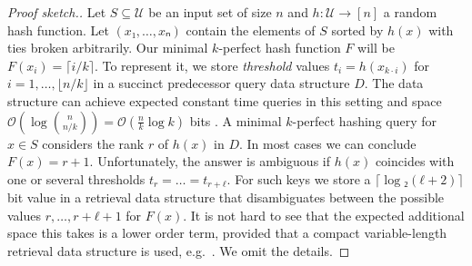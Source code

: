 \documentclass[cleveref,thm-restate]{lipics-v2021}
\begin{document}
\begin{proof}[Proof sketch.]
    Let $S ⊆ 𝒰$ be an input set of size $n$ and $h : 𝒰 → [n]$ a random hash function. Let $(x₁,…,xₙ)$ contain the elements of $S$ sorted by $h(x)$ with ties broken arbitrarily. Our minimal $k$-perfect hash function $F$ will be $F(x_i) = ⌈i/k⌉$. To represent it, we store \emph{threshold} values $t_i = h(x_{k·i})$ for $i = 1,…,⌊n/k⌋$ in a succinct predecessor query data structure $D$. The data structure can achieve expected constant time queries in this setting and space $𝒪(\log \binom{n}{n/k}) = 𝒪(\frac{n}{k} \log k)$ bits \cite{KLS:PaCHash:2023}. A minimal $k$-perfect hashing query for $x ∈ S$ considers the rank $r$ of $h(x)$ in $D$. In most cases we can conclude $F(x) = r+1$. Unfortunately, the answer is ambiguous if $h(x)$ coincides with one or several thresholds $t_{r} = … = t_{r+ℓ}$. For such keys we store a $⌈\log₂(ℓ+2)⌉$ bit value in a retrieval data structure that disambiguates between the possible values $r,…,r+ℓ+1$ for $F(x)$. It is not hard to see that the expected additional space this takes is a lower order term, provided that a compact variable-length retrieval data structure is used, e.g.\ \cite{belazzougui2013compressed}. We omit the details.
\end{proof}
\end{document}
